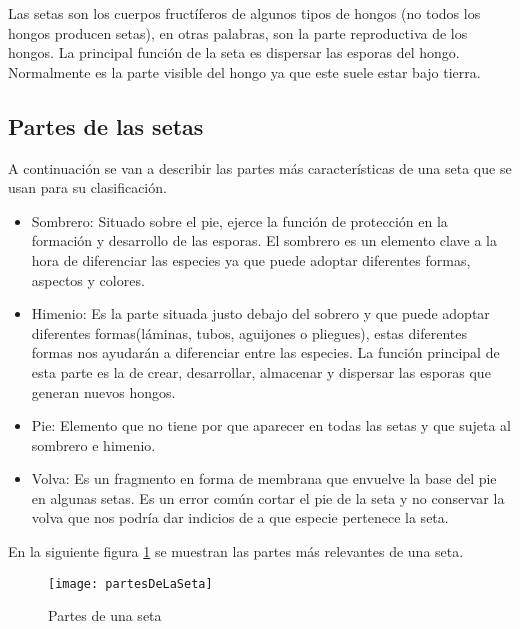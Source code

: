 Las setas son los cuerpos fructíferos de algunos tipos de hongos (no todos los hongos producen setas), en otras palabras, son la parte reproductiva de los hongos. La principal función de la seta es dispersar las esporas del hongo. Normalmente es la parte visible del hongo ya que este suele estar bajo tierra.

\subsection{Partes de las setas}

A continuación se van a describir las partes más características de una seta que se usan para su clasificación.

\begin{itemize}
	\item{Sombrero}: Situado sobre el pie, ejerce la función de protección en la formación y desarrollo de las esporas. El sombrero es un elemento clave a la hora de diferenciar las especies ya que puede adoptar diferentes formas, aspectos y colores.
	\item{Himenio}: Es la parte situada justo debajo del sobrero y que puede adoptar diferentes formas(láminas, tubos, aguijones o pliegues), estas diferentes formas nos ayudarán a diferenciar entre las especies. La función principal de esta parte es la de crear, desarrollar, almacenar y dispersar las esporas que generan nuevos hongos.
	\item{Pie}: Elemento que no tiene por que aparecer en todas las setas y que sujeta al sombrero e himenio.
	\item{Volva}: Es un fragmento en forma de membrana que envuelve la base del pie en algunas setas. Es un error común cortar el pie de la seta y no conservar la volva que nos podría dar indicios de a que especie pertenece la seta.~\cite{partesSeta}
\end{itemize}

En la siguiente figura \ref{figpartesDeLaSeta} se muestran las partes más relevantes de una seta.

\begin{figure}[h]
    \begin{center}%
        \begin{center}%
          \texttt{[image: partesDeLaSeta]}%
          \caption{Partes de una seta}%
          \label{figpartesDeLaSeta}%
        \end{center}%
  	\end{center}%
\end{figure}%


